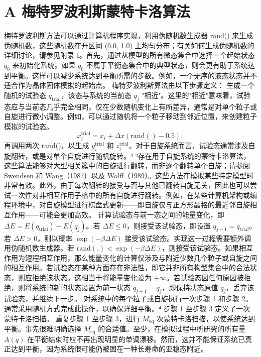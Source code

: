 \section{A 梅特罗波利斯蒙特卡洛算法}\label{a-ux6885ux7279ux7f57ux6ce2ux5229ux65afux8499ux7279ux5361ux6d1bux7b97ux6cd5}
梅特罗波利斯方法可以通过计算机程序实现，利用伪随机数生成器 rand() 来生成伪随机数，这些随机数在开区间 (0.0, 1.0) 上均匀分布；有关如何生成伪随机数的详细讨论，请参见附录 I。首先，通过从模型的所有微态集合中选择一个起始状态 \(q_0\) 来初始化系统。如果 \(q_0\) 不属于平衡态集合中的典型状态，则会更有助于系统达到平衡。这样可以减少系统达到平衡所需的步数。例如，一个无序的液态状态并不适合作为晶体固体模拟的起始点。
梅特罗波利斯算法由以下步骤定义：
生成一个随机的试验态 \(q_{\mathrm{trial}}\)，该态与系统的当前态 \(q_{j}\) "相近"。这里的"相近"意味着，试验态应与当前态几乎完全相同，仅在少数随机变化上有所差异，通常是对单个粒子或自旋进行微小调整。例如，可以通过随机将一个粒子移动到邻近位置，来创建粒子模拟的试验态。
\begin{equation}\tag{16.2.8}\label{eq:16.2.8}
x _ { i } ^{\mathrm { t r i a l} } = x _ { i } + \Delta x ( \mathrm { r a n d } ( ) - 0 . 5 ) ,
\end{equation}
再调用两次 rand()，以生成 \(y_{i}^{\mathrm{trial}}\) 和 \(z_{i}^{\mathrm{trial}}\)。对于自旋系统而言，试验态通常涉及自旋翻转，或是对单个自旋进行随机旋转。³
³存在用于自旋系统的蒙特卡洛算法，这些算法能够对大型相关簇中的自旋进行翻转，而非逐个翻转单个自旋；请参阅 Swendsen 和 Wang（1987）以及 Wolff（1989）。这些方法在模拟某些特定模型时非常有效。此外，由于每次翻转的接受与否与其他已翻转自旋无关，因此也可以尝试一次性对非相互作用子格中的所有自旋进行翻转。例如，在某些计算机架构或编程环境中，对自旋模型进行棋盘式更新——即自旋仅与正方形晶格的最近邻自旋相互作用——可能会更加高效。
计算试验态与前一态之间的能量变化，即 \(\Delta E = E(q_{\text{trial}}) - E(q_j)\)。若 \(\Delta E \leq 0\)，则接受该试验态，即设置 \(q_{j+1} = q_{\text{trial}}\)。若 \(\Delta E > 0\)，则以概率 \(\exp(-\beta \Delta E)\) 接受该试验态。实现这一过程需要额外调用伪随机数生成器。若 \(\text{rand}(.) < \exp(-\beta \Delta E)\)，则接受该试验态。如果相互作用为短程相互作用，那么能量变化的计算仅涉及与附近少数几个粒子或自旋之间的相互作用。若试验态在某种方面存在非法性，即它并非所有构型集合中的合法状态，则应拒绝该状态。这相当于将能量变化设为 \(+\infty\)。若试验态因任何原因被拒绝，则将系统的新的状态设置为前一状态 \(q_{j+1} = q_j\)，即保持状态原值 \(q_j\)，丢弃该试验态，并继续下一步。
对系统中的每个粒子或自旋执行一次步骤 1 和步骤 2。通常采用随机方式完成此操作，以确保详细平衡。⁴ 步骤 1 至步骤 3 定义了一次蒙特卡洛扫描。
重复步骤 1 至步骤 3，进行 \(M_{\text{eq}}\) 次蒙特卡洛扫描，以使系统达到平衡。事先很难明确选择 \(M_{\text{eq}}\) 的合适值。至少，在模拟过程中所研究的所有量 \(A(q)\) 在平衡结束时应不再出现明显的单调漂移。然而，这并不能保证系统已真正达到平衡，因为系统很可能仍被困在一种长寿命的亚稳态附近。
